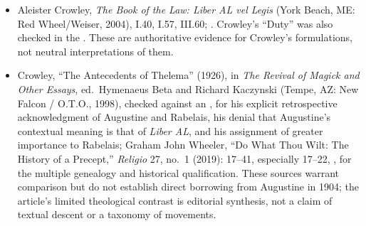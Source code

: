 {\begin{itemize}[itemsep=0pt,parsep=0pt,topsep=0.05em]
\item Aleister Crowley, \emph{The Book of the Law: Liber AL vel Legis} (York Beach, ME: Red Wheel/Weiser, 2004), I.40, I.57, III.60; . Crowley's ``Duty'' was also checked in the . These are authoritative evidence for Crowley's formulations, not neutral interpretations of them.
\item Crowley, ``The Antecedents of Thelema'' (1926), in \emph{The Revival of Magick and Other Essays}, ed.~Hymenaeus Beta and Richard Kaczynski (Tempe, AZ: New Falcon / O.T.O., 1998), checked against an , for his explicit retrospective acknowledgment of Augustine and Rabelais, his denial that Augustine's contextual meaning is that of \emph{Liber AL}, and his assignment of greater importance to Rabelais; Graham John Wheeler, ``Do What Thou Wilt: The History of a Precept,'' \emph{Religio} 27, no.~1 (2019): 17--41, especially 17--22, , for the multiple genealogy and historical qualification. These sources warrant comparison but do not establish direct borrowing from Augustine in 1904; the article's limited theological contrast is editorial synthesis, not a claim of textual descent or a taxonomy of movements.
\end{itemize}}

\endgroup
